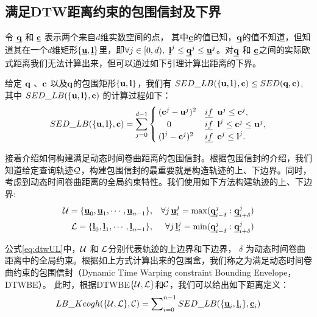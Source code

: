 \subsection{满足DTW距离约束的包围信封及下界} 
令 $\emph{{\textbf{q}}}$ 和 $\emph{{\textbf{c}}}$ 表示两个来自$d$维实数空间的点， 其中$\emph{{\textbf{c}}}$的值已知，$\emph{{\textbf{q}}}$的值不知道，但知道其在一个$d$维矩形$\{\emph{{\textbf{u}}}, \emph{{\textbf{l}}}\}$里，即$\forall j\in [0, d),  \,\, {\emph{{\textbf{l}}}}^{j}  \le \emph{{\textbf{q}}}^{j} \le \emph{{\textbf{u}}}^{j}$。对$\emph{{\textbf{q}}}$ 和 $\emph{{\textbf{c}}}$之间的实际欧式距离我们无法计算出来，但可以通过如下引理计算出距离的下界。
\begin{lemma}\label{theory:SEDLB}
	给定 $\textbf{q}$ 、$\textbf{c}$ 以及$\textbf{q}$的包围矩形$\{\textbf{u}, \textbf{l}\}$，我们有
	$SED\_LB(\{{\textbf{u}},\textbf{l} \},\textbf{c})\le SED(\textbf{q},\textbf{c})$, 其中 $SED\_LB(\{{\textbf{u}},\textbf{l} \},\textbf{c})$ 的计算过程如下：
	\allowdisplaybreaks
	\begin{equation}
	SED\_LB(\{{\textbf{u}},\textbf{l} \},\textbf{c}) =
	\sum_{j=0}^{d-1} \begin{cases}
	({\textbf{c}}^{j}- {\textbf{u}}^{j})^2 & \emph{if} \,\,\,   \textbf{u}^{j} \le {\textbf{c}}^{j},\\
	\quad 0 &   \emph{if} \,\,\,  \textbf{l}^{j} \le  {\textbf{c}}^{j} \le \textbf{u}^{j},\\
	({\textbf{l}}^{j} -{\textbf{c}}^{j})^2 & \emph{if} \,\,\,    {\textbf{c}}^{j} \le \textbf{l}^{j}.\\
	\end{cases}
	\end{equation}
	\allowdisplaybreaks[4]
\end{lemma}

接着介绍如何构建满足动态时间卷曲距离的包围信封。根据包围信封的介绍，我们知道给定查询轨迹$\cal Q$，构建包围信封的最重要就是构造轨迹的上、下边界。同时，考虑到动态时间卷曲距离的全局约束特性。我们使用如下方法构建轨迹的上、下边界:
\begin{eqnarray}\label{eq:dtwUL}
{\cal U} = \{\emph{{\textbf{u}}}_{0},\emph{{\textbf{u}}}_{1},\cdots, \emph{{\textbf{u}}}_{n-1} \} &,& \forall j  \, \emph{{\textbf{u}}}_{i}^{j}=\max(\emph{{\textbf{q}}}_{i-\delta}^{j} : \emph{{\textbf{q}}}_{i+\delta}^{j}) \nonumber \\
{\cal L} = \{\emph{{\textbf{l}}}_{0},\emph{{\textbf{l}}}_{1},\cdots, \emph{{\textbf{l}}}_{n-1} \}&,& \forall j  \, \emph{{\textbf{l}}}_{i}^{j}=\min(\emph{{\textbf{q}}}_{i-\delta}^{j} : \emph{{\textbf{q}}}_{i+\delta}^{j})
\end{eqnarray}

公式\ref{eq:dtwUL}中，${\cal U}$ 和 ${\cal L}$分别代表轨迹的上边界和下边界， $\delta$ 为动态时间卷曲距离中的全局约束。根据如上方式计算出来的包围盒，我们称之为满足动态时间卷曲约束的包围信封（Dynamic Time Warping constraint Bounding Envelope，DTWBE）。
此时，根据DTWBE$\{{\cal U}, {\cal L}\}  $和$\cal C$，我们可以给出如下距离定义：
\begin{equation}\label{eq:LBKeogh}
LB\_Keogh({\{\cal U,\cal L\},{\cal C}})=  \sum\nolimits_{i=0}^{n-1}	SED\_LB(\{{\emph{{\textbf{u}}}_{i}},\emph{{\textbf{l}}}_{i} \},\emph{{\textbf{c}}}_{i})
\end{equation}

